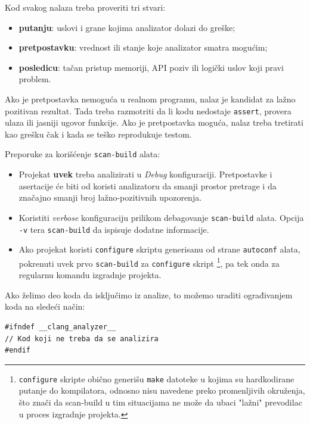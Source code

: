 Kod svakog nalaza treba proveriti tri stvari:

\begin{itemize}
\tightlist
\item
  \textbf{putanju}: uslovi i grane kojima analizator dolazi do greške;
\item
  \textbf{pretpostavku}: vrednost ili stanje koje analizator smatra mogućim;
\item
  \textbf{posledicu}: tačan pristup memoriji, API poziv ili logički uslov koji pravi problem.
\end{itemize}

Ako je pretpostavka nemoguća u realnom programu, nalaz je kandidat za lažno pozitivan rezultat. Tada treba razmotriti da li kodu nedostaje \texttt{assert}, provera ulaza ili jasniji ugovor funkcije. Ako je pretpostavka moguća, nalaz treba tretirati kao grešku čak i kada se teško reprodukuje testom.

Preporuke za korišćenje \texttt{scan-build} alata:

\begin{itemize}
\tightlist
\item
  Projekat \textbf{uvek} treba analizirati u \emph{Debug} konfiguraciji. Pretpostavke i asertacije će biti od koristi analizatoru da smanji prostor pretrage i da značajno smanji broj lažno-pozitivnih upozorenja.
\item
  Koristiti \emph{verbose} konfiguraciju prilikom debagovanje \texttt{scan-build} alata. Opcija \texttt{-v} tera \texttt{scan-build} da ispisuje dodatne informacije.
\item
  Ako projekat koristi \texttt{configure} skriptu generisanu od strane \texttt{autoconf} alata, pokrenuti uvek prvo \texttt{scan-build} za \texttt{configure} skript \footnote{\texttt{configure} skripte obično generišu \texttt{make} datoteke u kojima su hardkodirane putanje do kompilatora, odnosno nisu navedene preko promenljivih okruženja, što znači da scan-build u tim situacijama ne može da ubaci "lažni" prevodilac u proces izgradnje projekta.}, pa tek onda za regularnu komandu izgradnje projekta.
\end{itemize}

Ako želimo deo koda da isključimo iz analize, to možemo uraditi ograđivanjem koda na sledeći način:

\begin{verbatim}
#ifndef __clang_analyzer__
// Kod koji ne treba da se analizira
#endif
\end{verbatim}

